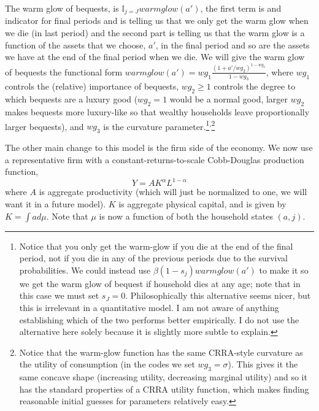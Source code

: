 The warm glow of bequests, is $\mathbb{I}_{j=J} warmglow(a')$, the first term is and indicator for final periods and is telling us that we only get the warm glow when we die (in last period) and the second part is telling us that the warm glow is a function of the assets that we choose, $a'$, in the final period and so are the assets we have at the end of the final period when we die. We will give the warm glow of bequests the functional form $warmglow(a')=wg_1 \frac{(1+a'/wg_2)^{1-wg_3}}{1-wg_3}$, where $wg_1$ controls the (relative) importance of bequests, $wg_2 \geq 1$ controls the degree to which bequests are a luxury good ($wg_2=1$ would be a normal good, larger $wg_2$ makes bequests more luxury-like so that wealthy households leave proportionally larger bequests), and $wg_3$ is the curvature parameter.\footnote{Notice that you only get the warm-glow if you die at the end of the final period, not if you die in any of the previous periods due to the survival probabilities. We could instead use $\beta (1-s_j)warmglow(a')$ to make it so we get the warm glow of bequest if household dies at any age; note that in this case we must set $s_J=0$. Philosophically this alternative seems nicer, but this is irrelevant in a quantitative model. I am not aware of anything establishing which of the two performs better empirically. I do not use the alternative here solely because it is slightly more subtle to explain.}\textsuperscript{,}\footnote{Notice that the warm-glow function has the same CRRA-style curvature as the utility of consumption (in the codes we set $wg_3=\sigma$). This gives it the same concave shape (increasing utility, decreasing marginal utility) and so it has the standard properties of a CRRA utility function, which makes finding reasonable initial guesses for parameters relatively easy.}

The other main change to this model is the firm side of the economy. We now use a representative firm with a constant-returns-to-scale Cobb-Douglas production function,
\begin{equation}
 Y= A K^{\alpha} L^{1-\alpha}
\end{equation}
where $A$ is aggregate productivity (which will just be normalized to one, we will want it in a future model). $K$ is aggregate physical capital, and is given by $K=\int a d\mu$. Note that $\mu$ is now a function of both the household states $(a,j)$.


